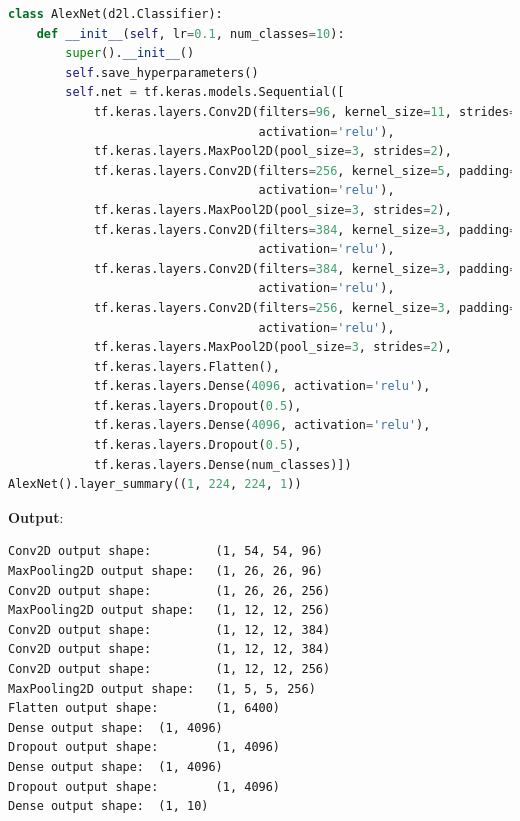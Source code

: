 \begin{lstlisting}[language=Python,caption=AlexNet - tensorflow - Python]
class AlexNet(d2l.Classifier):
    def __init__(self, lr=0.1, num_classes=10):
        super().__init__()
        self.save_hyperparameters()
        self.net = tf.keras.models.Sequential([
            tf.keras.layers.Conv2D(filters=96, kernel_size=11, strides=4,
                                   activation='relu'),
            tf.keras.layers.MaxPool2D(pool_size=3, strides=2),
            tf.keras.layers.Conv2D(filters=256, kernel_size=5, padding='same',
                                   activation='relu'),
            tf.keras.layers.MaxPool2D(pool_size=3, strides=2),
            tf.keras.layers.Conv2D(filters=384, kernel_size=3, padding='same',
                                   activation='relu'),
            tf.keras.layers.Conv2D(filters=384, kernel_size=3, padding='same',
                                   activation='relu'),
            tf.keras.layers.Conv2D(filters=256, kernel_size=3, padding='same',
                                   activation='relu'),
            tf.keras.layers.MaxPool2D(pool_size=3, strides=2),
            tf.keras.layers.Flatten(),
            tf.keras.layers.Dense(4096, activation='relu'),
            tf.keras.layers.Dropout(0.5),
            tf.keras.layers.Dense(4096, activation='relu'),
            tf.keras.layers.Dropout(0.5),
            tf.keras.layers.Dense(num_classes)])
AlexNet().layer_summary((1, 224, 224, 1))
\end{lstlisting}

\textbf{Output}:

\begin{lstlisting}[numbers=none]
Conv2D output shape:         (1, 54, 54, 96)
MaxPooling2D output shape:   (1, 26, 26, 96)
Conv2D output shape:         (1, 26, 26, 256)
MaxPooling2D output shape:   (1, 12, 12, 256)
Conv2D output shape:         (1, 12, 12, 384)
Conv2D output shape:         (1, 12, 12, 384)
Conv2D output shape:         (1, 12, 12, 256)
MaxPooling2D output shape:   (1, 5, 5, 256)
Flatten output shape:        (1, 6400)
Dense output shape:  (1, 4096)
Dropout output shape:        (1, 4096)
Dense output shape:  (1, 4096)
Dropout output shape:        (1, 4096)
Dense output shape:  (1, 10)
\end{lstlisting}













